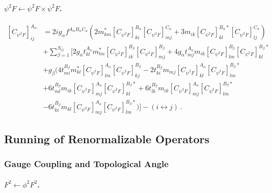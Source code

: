 \paragraph{$\psi^2 F \leftarrow \psi^2 F \times \psi^2 F$.}

\begin{align}
    \left[\dot C_{\psi^2 F}\right]_{ij}^{A_\alpha} & = 
    2i g_\alpha f^{A_\alpha B_\alpha C_\alpha}\left(
    2m^*_{km}\left[C_{\psi^2 F}\right]_{ki}^{B_\alpha}\left[C_{\psi^2 F}\right]_{mj}^{C_\alpha}
    + 3 m_{ik}\left[C_{\psi^2 F}\right]_{kl}^{B_\alpha *}\left[C_{\psi^2 F}\right]_{lj}^{C_\alpha}
    \right)
    \nonumber \\&
    +\sum_{\beta=1}^{N_G}\Bigg[
    2 g_\alpha t^{A_\alpha}_{kl} m^*_{lm}\left[C_{\psi^2 F}\right]_{ik}^{B_\beta}\left[C_{\psi^2 F}\right]_{mj}^{B_\beta}
    + 4 g_\alpha t^{A_\alpha}_{mj} m_{ik}\left[C_{\psi^2 F}\right]_{lm}^{B_\beta}\left[C_{\psi^2 F}\right]_{kl}^{B_\beta *}
    \nonumber \\&
    + g_\beta \Bigg(
    4 t^{B_\beta}_{mi} m^*_{kl}\left[C_{\psi^2 F}\right]_{lm}^{A_\alpha}\left[C_{\psi^2 F}\right]_{kj}^{B_\beta}
    -2 t^{B_\beta}_{ki} m_{mj}\left[C_{\psi^2 F}\right]_{kl}^{A_\alpha}\left[C_{\psi^2 F}\right]_{lm}^{B_\beta *}
    \nonumber \\&
    +6 t^{B_\beta}_{ml} m_{ik}\left[C_{\psi^2 F}\right]_{mj}^{A_\alpha}\left[C_{\psi^2 F}\right]_{kl}^{B_\beta *}
    + 6 t^{B_\beta}_{lk} m_{ik}\left[C_{\psi^2 F}\right]_{mj}^{A_\alpha}\left[C_{\psi^2 F}\right]_{lm}^{B_\beta *}
    \nonumber \\&
    -6 t^{B_\beta}_{ki}m_{kl}\left[C_{\psi^2 F}\right]_{mj}^{A_\alpha}\left[C_{\psi^2 F}\right]_{lm}^{B_\beta *} \Bigg)\Bigg] - \left(i \leftrightarrow j\right)\,.
\end{align}

\subsection{Running of Renormalizable Operators}

\subsubsection{Gauge Coupling and Topological Angle\label{sunsec:gauge_topo}} 

\paragraph{\texorpdfstring{$F^2\leftarrow \phi^2 F^2$}{F2fromphi2F2}.}

